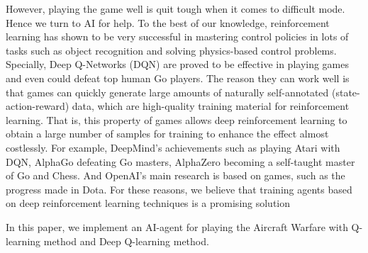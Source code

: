 \documentclass{article}
\begin{document}
\par However, playing the game well is quit tough when it comes to difficult mode. Hence we turn to AI for help. To the best of our knowledge, reinforcement learning has shown to be very successful in mastering control policies in lots of tasks such as object recognition and solving physics-based control problems\cite{}. Specially, Deep Q-Networks (DQN) are proved to be effective in playing games and even could defeat top human Go players\cite{}. The reason they can work well is that games can quickly generate large amounts of naturally self-annotated (state-action-reward) data, which are high-quality training material for reinforcement learning. That is, this property of games allows deep reinforcement learning to obtain a large number of samples for training to enhance the effect almost costlessly. For example, DeepMind's achievements such as playing Atari with DQN, AlphaGo defeating Go masters, AlphaZero becoming a self-taught master of Go and Chess. And OpenAI's main research is based on games, such as the progress made in Dota. For these reasons, we believe that training agents based on deep reinforcement learning techniques is a promising solution

\par In this paper, we implement an AI-agent for playing the Aircraft Warfare with Q-learning method and Deep Q-learning method. 



\end{document}
